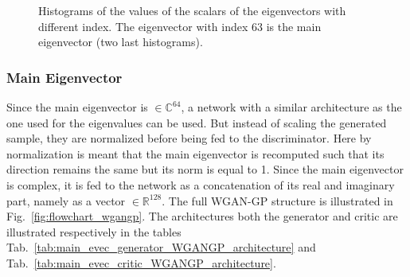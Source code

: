 \documentclass[11pt,a4paper,twoside]{report}
\begin{document}
\begin{figure}
    \centering
    \caption{Histograms of the values of the scalars of the eigenvectors with different index. The eigenvector with index $63$ is the main eigenvector (two last histograms).}
    \label{fig:histograms_eigenvectors}
\end{figure}

\subsubsection{Main Eigenvector}

Since the main eigenvector is $\in \mathbb{C}^{64}$, a network with a similar architecture as the one used for the eigenvalues can be used. But instead of scaling the generated sample, they are normalized before being fed to the discriminator. Here by normalization is meant that the main eigenvector is recomputed such that its direction remains the same but its norm is equal to 1. Since the main eigenvector is complex, it is fed to the network as a concatenation of its real and imaginary part, namely as a vector $\in \mathbb{R}^{128}$. The full WGAN-GP structure is illustrated in Fig.~\ref{fig:flowchart_wgangp}. The architectures both the generator and critic are illustrated respectively in the tables Tab.~\ref{tab:main_evec_generator_WGANGP_architecture} and Tab.~\ref{tab:main_evec_critic_WGANGP_architecture}.
\end{document}
